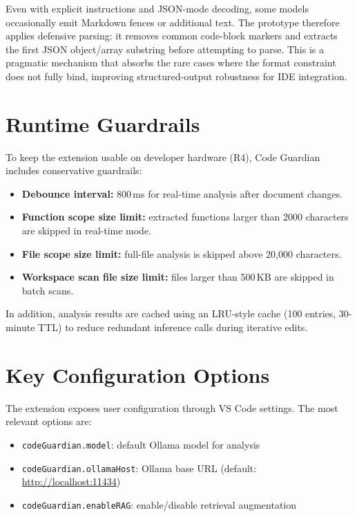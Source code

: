 Even with explicit instructions and JSON-mode decoding, some models occasionally emit Markdown fences or additional text. The prototype therefore applies defensive parsing: it removes common code-block markers and extracts the first JSON object/array substring before attempting to parse. This is a pragmatic mechanism that absorbs the rare cases where the format constraint does not fully bind, improving structured-output robustness for IDE integration.

\section{Runtime Guardrails}
\label{app:guardrails}

To keep the extension usable on developer hardware (R4), Code Guardian includes conservative guardrails:
\begin{itemize}
  \item \textbf{Debounce interval:} 800\,ms for real-time analysis after document changes.
  \item \textbf{Function scope size limit:} extracted functions larger than 2000 characters are skipped in real-time mode.
  \item \textbf{File scope size limit:} full-file analysis is skipped above 20{,}000 characters.
  \item \textbf{Workspace scan file size limit:} files larger than 500\,KB are skipped in batch scans.
\end{itemize}

In addition, analysis results are cached using an LRU-style cache (100 entries, 30-minute TTL) to reduce redundant inference calls during iterative edits.

\section{Key Configuration Options}
\label{app:config}

The extension exposes user configuration through VS Code settings. The most relevant options are:
\begin{itemize}
  \item \texttt{codeGuardian.model}: default Ollama model for analysis
  \item \texttt{codeGuardian.ollamaHost}: Ollama base URL (default: \url{http://localhost:11434})
  \item \texttt{codeGuardian.enableRAG}: enable/disable retrieval augmentation
\end{itemize}

